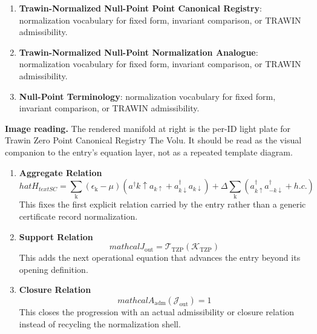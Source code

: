 \begin{enumerate}[leftmargin=1.6em,itemsep=6pt,topsep=4pt]
\item \textbf{Trawin-Normalized Null-Point Point Canonical Registry}: normalization vocabulary for fixed form, invariant comparison, or TRAWIN admissibility.
\item \textbf{Trawin-Normalized Null-Point Normalization Analogue}: normalization vocabulary for fixed form, invariant comparison, or TRAWIN admissibility.
\item \textbf{Null-Point Terminology}: normalization vocabulary for fixed form, invariant comparison, or TRAWIN admissibility.
\end{enumerate}

\begin{samepage}
\noindent\begin{minipage}[t]{0.45\linewidth}
\vspace{0pt}
\raggedright
\scriptsize\textbf{Image reading.} The rendered manifold at right is the per-ID light plate for Trawin Zero Point Canonical Registry The Volu. It should be read as the visual companion to the entry's equation layer, not as a repeated template diagram.\par
\end{minipage}\hfill
\begin{minipage}[t]{0.53\linewidth}
\vspace*{-0.10in}
\raggedright
{}
\end{minipage}
\end{samepage}

\clearpage


\begin{enumerate}[leftmargin=1.6em,itemsep=9pt,topsep=6pt]
\item \textbf{Aggregate Relation}
\[
hat{H}_{ text{SC}} = \sum_{\mathrm{k}} (\epsilon_{\mathrm{k}} - \mu)(a^\dagger{k\uparrow} a_{k\uparrow} + a^\dagger_{k\downarrow} a_{k\downarrow}) + \Delta \sum_{\mathrm{k}} (a^\dagger_{k\uparrow} a^\dagger_{-k\downarrow} + h.c.)
\]
This fixes the first explicit relation carried by the entry rather than a generic certificate record normalization.

\item \textbf{Support Relation}
\[
mathcal{J}_{\mathrm{out}} = \mathcal{T}_{\mathrm{TZP}}\!\left(\mathcal{K}_{\mathrm{TZP}}\right)
\]
This adds the next operational equation that advances the entry beyond its opening definition.

\item \textbf{Closure Relation}
\[
mathcal{A}_{\mathrm{adm}}\!\left(\mathcal{J}_{\mathrm{out}}\right)=1
\]
This closes the progression with an actual admissibility or closure relation instead of recycling the normalization shell.
\end{enumerate}

